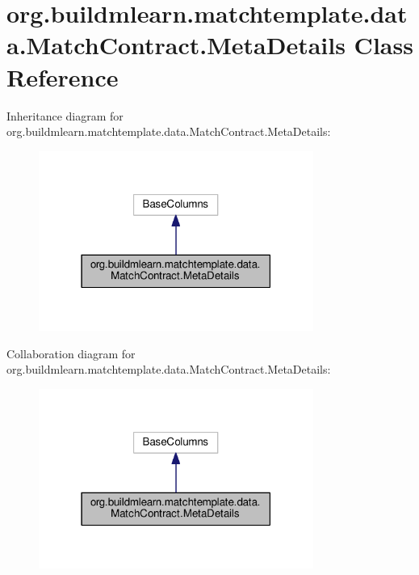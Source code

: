 \hypertarget{classorg_1_1buildmlearn_1_1matchtemplate_1_1data_1_1MatchContract_1_1MetaDetails}{}\section{org.\+buildmlearn.\+matchtemplate.\+data.\+Match\+Contract.\+Meta\+Details Class Reference}
\label{classorg_1_1buildmlearn_1_1matchtemplate_1_1data_1_1MatchContract_1_1MetaDetails}


Inheritance diagram for org.\+buildmlearn.\+matchtemplate.\+data.\+Match\+Contract.\+Meta\+Details\+:
\nopagebreak
\begin{figure}[H]
\begin{center}
\leavevmode
\includegraphics[width=255pt]{classorg_1_1buildmlearn_1_1matchtemplate_1_1data_1_1MatchContract_1_1MetaDetails__inherit__graph}
\end{center}
\end{figure}


Collaboration diagram for org.\+buildmlearn.\+matchtemplate.\+data.\+Match\+Contract.\+Meta\+Details\+:
\nopagebreak
\begin{figure}[H]
\begin{center}
\leavevmode
\includegraphics[width=255pt]{classorg_1_1buildmlearn_1_1matchtemplate_1_1data_1_1MatchContract_1_1MetaDetails__coll__graph}
\end{center}
\end{figure}
